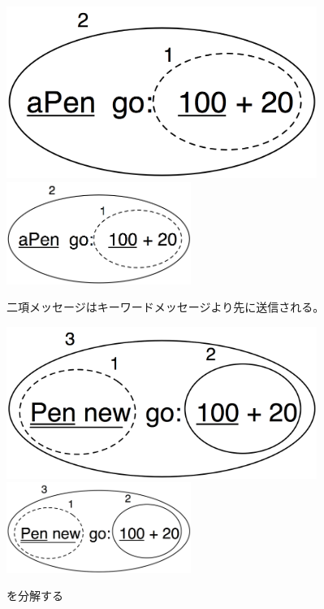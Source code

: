 \documentclass[a4paper,10pt,twoside]{book}
\begin{document}
\begin{figure}[htb]
\begin{minipage}{0.48\textwidth}
	\ifluluelse
		{\centerline{\includegraphics[width=0.9\textwidth]{uKeyBin}}}
		{\centerline{\includegraphics[width=6cm]{uKeyBin}}}
	\caption{二項メッセージはキーワードメッセージより先に送信される。}
\end{minipage}
\hfill
\begin{minipage}{0.48\textwidth}
	\begin{center}
	\ifluluelse
		{\includegraphics[width=0.9\textwidth]{uunKeyBin}}
		{\includegraphics[width=6cm]{uunKeyBin}}
\caption{ を分解する}
\end{center}
\end{minipage}
\end{figure}
\end{document}
